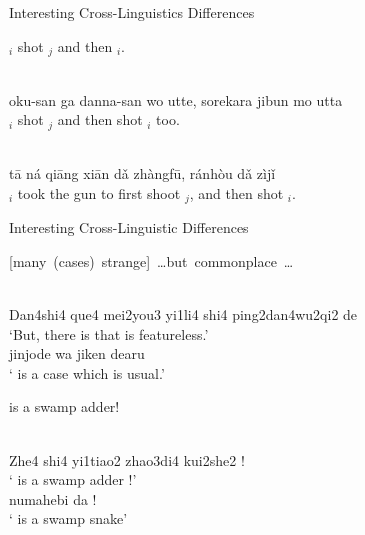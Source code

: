 \documentclass{beamer}
\begin{document}
\begin{frame}{Interesting Cross-Linguistics Differences}
  \begin{exe}
\ex {}$_i$ shot $_j$ and then $_i$.
\begin{xlist}
  
  \\
     oku-san ga danna-san wo utte, sorekara jibun mo utta \\
     \trans {}$_i$ shot $_j$ and then shot $_i$ too.

 \\
     tā ná qiāng xiān dǎ zhàngfū, ránhòu dǎ zìjǐ \\
     \trans {}$_i$ took the gun to first shoot $_j$, and then shot $_i$.
   \end{xlist}
 \end{exe}
\end{frame}

\begin{frame}{Interesting Cross-Linguistic Differences}
\begin{exe}
\ex\label{s:none}    \mbox{[many (cases) strange] \ldots but  commonplace \ldots}
\begin{xlist}
  \ex \gll {}       \\
  Dan4shi4 que4 mei2you3 yi1li4 shi4 ping2dan4wu2qi2 de \\
  \trans ‘But, there is  that is featureless.’
  \ex \gll {}      \\
     jinjode   wa     jiken dearu \\
  \trans ‘ is a case which is  usual.’
\end{xlist}
  \ex\label{s:dif}   is a swamp adder!
  \begin{xlist}
    \ex \gll {}      \\
    Zhe4 shi4 yi1tiao2 zhao3di4 kui2she2 ! \\
    \trans ` is a swamp adder !'
    \ex \gll {}   \\
    numahebi da ! \\
    \trans `\wemp{$\phi$} is a swamp snake'
  \end{xlist}
\end{exe}
\end{frame}
\end{document}
